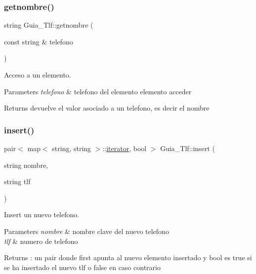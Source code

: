 \subsubsection{\texorpdfstring{getnombre()}{getnombre()}}
{\footnotesize\ttfamily string Guia\+\_\+\+Tlf\+::getnombre (\begin{DoxyParamCaption}\item[{const string \&}]{telefono }\end{DoxyParamCaption})}



Acceso a un elemento. 


\begin{DoxyParams}{Parameters}
{\em telefono} & telefono del elemento elemento acceder \\
\hline
\end{DoxyParams}
\begin{DoxyReturn}{Returns}
devuelve el valor asociado a un telefono, es decir el nombre 
\end{DoxyReturn}
\mbox{\label{classGuia__Tlf_add78a6fe5e8090ad6f71bbb160b70f77}} 
\subsubsection{\texorpdfstring{insert()}{insert()}\hspace{0.1cm}{\footnotesize\ttfamily [1/2]}}
{\footnotesize\ttfamily pair$<$ map$<$ string, string $>$\+::\mbox{\hyperlink{classGuia__Tlf_1_1iterator}{iterator}}, bool $>$ Guia\+\_\+\+Tlf\+::insert (\begin{DoxyParamCaption}\item[{string}]{nombre,  }\item[{string}]{tlf }\end{DoxyParamCaption})}



Insert un nuevo telefono. 


\begin{DoxyParams}{Parameters}
{\em nombre} & nombre clave del nuevo telefono \\
\hline
{\em tlf} & numero de telefono \\
\hline
\end{DoxyParams}
\begin{DoxyReturn}{Returns}
\+: un pair donde first apunta al nuevo elemento insertado y bool es true si se ha insertado el nuevo tlf o false en caso contrario 
\end{DoxyReturn}
\mbox{\label{classGuia__Tlf_a4c4e4cc9540896434edd915296e56c87}} 
